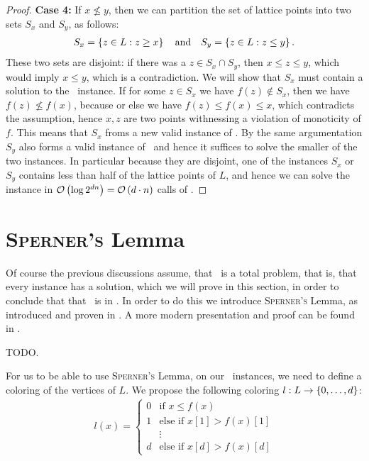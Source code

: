 \begin{proof}
    \textbf{Case 4:} If $x \not\leq y$, then we can partition the set of lattice points into two sets $S_x$ and $S_y$, as follows:
    \begin{align*}
        S_x = \left\{z \in L : z \geq x\right\} \quad \text{and} \quad S_y = \left\{z \in L : z \leq y\right\}.
    \end{align*}
    These two sets are disjoint: if there was a $z \in S_x \cap S_y$, then $x \leq z \leq y$, which would imply $x \leq y$, which is a contradiction. We will show that $S_x$ must contain a solution to the \Tarski\ instance.
    If for some $z \in S_x$ we have $f(z) \not\in S_x$, then we have $f(z) \not\leq f(x)$, because or else we have $f(z) \leq f(x) \leq x$, which contradicts the assumption, hence $x, z$ are two points withnessing a violation of monoticity of $f$. This means that $S_x$ froms a new valid instance of \Tarski. By the same argumentation $S_y$ also forms a valid instance of \Tarski\ and hence it suffices to solve the smaller of the two instances. In particular because they are disjoint, one of the instances $S_x$ or $S_y$ contains less than half of the lattice points of $L$, and hence we can solve the instance in $\mathcal{O}\left(\log{2^{dn}}\right) = \mathcal{O}\left(d \cdot n\right)$ calls of \Tarskistar.
\end{proof}

\section{\textsc{Sperner's} Lemma}

Of course the previous discussions assume, that \Tarskistar\ is a total problem, that is, that every instance has a solution, which we will prove in this section, in order to conclude that that \Tarskistar\ is in \TFNP. In order to do this we introduce \textsc{Sperner's} Lemma, as introduced and proven in . A more modern presentation and proof can be found in .

\begin{theorem}
    TODO.
\end{theorem}

For us to be able to use \textsc{Sperner's} Lemma, on our \Tarskistar\ instances, we need to define a coloring of the vertices of $L$. We propose the following coloring $l : L \rightarrow \left\{0, \dots, d\right\}$:
\begin{align*}
    l(x) =
    \begin{cases}
        0 & \text{if $x \leq f(x)$}         \\
        1 & \text{else if $x[1] > f(x)[1]$} \\
          & \vdots                          \\
        d & \text{else if $x[d] > f(x)[d]$}
    \end{cases}
\end{align*}

